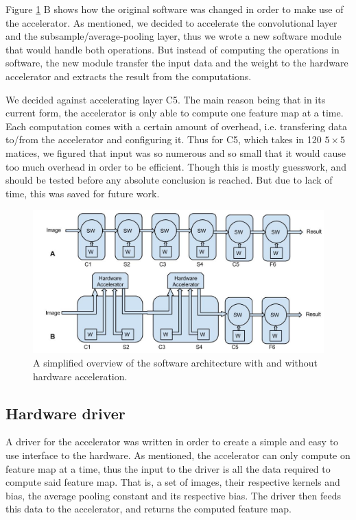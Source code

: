 Figure \ref{fig_software_architecture} B shows how the original software was changed in order to make use of the accelerator. As mentioned, we decided to accelerate the convolutional layer and the subsample/average-pooling layer, thus we wrote a new software module that would handle both operations. But instead of computing the operations in software, the new module transfer the input data and the weight to the hardware accelerator and extracts the result from the computations. 

We decided against accelerating layer C5. The main reason being that in its current form, the accelerator is only able to compute one feature map at a time. Each computation comes with a certain amount of overhead, i.e. transfering data to/from the accelerator and configuring it. Thus for C5, which takes in 120 $ 5 \times 5 $ matices, we figured that input was so numerous and so small that it would cause too much overhead in order to be efficient. Though this is mostly guesswork, and should be tested before any absolute conclusion is reached. But due to lack of time, this was saved for future work. 


\begin{figure}[h!]
  \centering
      \includegraphics[width=1.0\textwidth]{Figures/Method/SoftwareArchitecture}
    \caption{A simplified overview of the software architecture with and without hardware acceleration.}
    \label{fig_software_architecture}
\end{figure}

\subsection{Hardware driver}

A driver for the accelerator was written in order to create a simple and easy to use interface to the hardware. As mentioned, the accelerator can only compute on feature map at a time, thus the input to the driver is all the data required to compute said feature map. That is, a set of images, their respective kernels and bias, the average pooling constant and its respective bias. The driver then feeds this data to the accelerator, and returns the computed feature map. 

